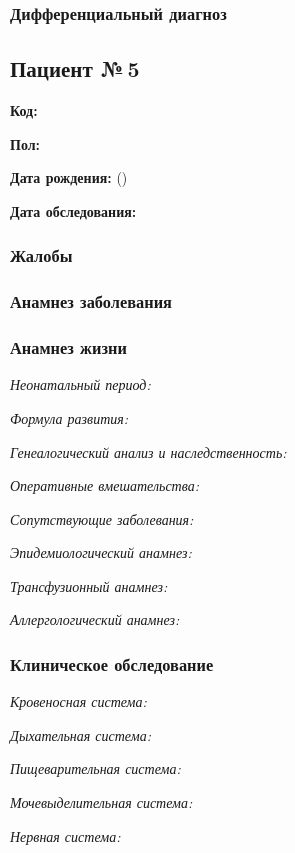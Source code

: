 \documentclass[a4paper,14pt]{extarticle}
\begin{document}
\subsubsection*{Дифференциальный диагноз}

\newpage
\subsection*{Пациент №\,5}

\textbf{Код:} 

\textbf{Пол:}

\textbf{Дата рождения:}  ()

\textbf{Дата обследования:} 

\subsubsection*{Жалобы}

\subsubsection*{Анамнез заболевания}

\subsubsection*{Анамнез жизни}

\emph{Неонатальный период:}

\emph{Формула развития:}

\emph{Генеалогический анализ и наследственность:}

\emph{Оперативные вмешательства:}

\emph{Сопутствующие заболевания:}

\emph{Эпидемиологический анамнез:}

\emph{Трансфузионный анамнез:}

\emph{Аллергологический анамнез:}

\subsubsection*{Клиническое обследование}

\emph{Кровеносная система:}

\emph{Дыхательная система:}

\emph{Пищеварительная система:}

\emph{Мочевыделительная система:}

\emph{Нервная система:} 
\end{document}
